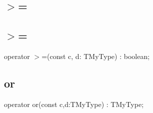\documentclass{report}
\newif\ifpdf
\begin{document}
\subsection*{\large{\textbf{{$>$}=}}\normalsize\hspace{1ex}\hrulefill}
\else
\subsection*{{$>$}=}
\fi
\label{ok_operator_test->=}
\index{{$>$}=}
\begin{list}{}{
\setlength{\itemindent}{0cm}
\setlength{\listparindent}{0cm}
\setlength{\leftmargin}{\evensidemargin}
\addtolength{\leftmargin}{\tmplength}
\settowidth{\labelsep}{X}
\addtolength{\leftmargin}{\labelsep}
\setlength{\labelwidth}{\tmplength}
}
\item[\textbf{Declaration}\hfill]
\ifpdf
\begin{flushleft}
\fi
\begin{ttfamily}
operator {$>$}=(const c, d: TMyType) : boolean;\end{ttfamily}

\ifpdf
\end{flushleft}
\fi

\end{list}
\ifpdf
\subsection*{\large{\textbf{or}}\normalsize\hspace{1ex}\hrulefill}
\else
\subsection*{or}
\fi
\label{ok_operator_test-or}
\begin{list}{}{
\setlength{\itemindent}{0cm}
\setlength{\listparindent}{0cm}
\setlength{\leftmargin}{\evensidemargin}
\addtolength{\leftmargin}{\tmplength}
\settowidth{\labelsep}{X}
\addtolength{\leftmargin}{\labelsep}
\setlength{\labelwidth}{\tmplength}
}
\item[\textbf{Declaration}\hfill]
\ifpdf
\begin{flushleft}
\fi
\begin{ttfamily}
operator or(const c,d:TMyType) : TMyType;\end{ttfamily}

\ifpdf
\end{flushleft}
\fi

\end{list}
\ifpdf
\end{document}
